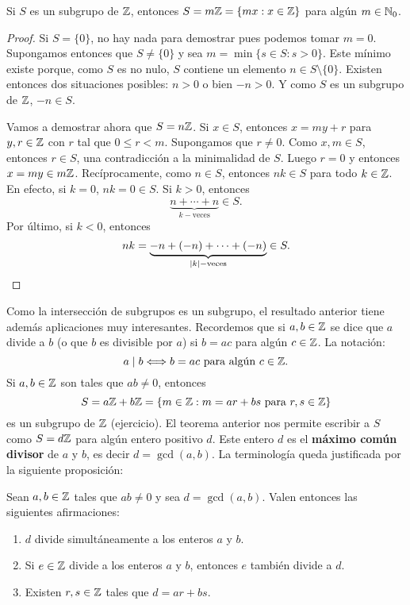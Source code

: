 
\begin{theorem}
\label{thm:Z}
	Si $S$ es un subgrupo de $\mathbb{Z}$, entonces 
	$S=m\mathbb{Z}=\{mx:x\in \mathbb{Z}\}$
	para algún $m\in\mathbb{N}_0$.  
\end{theorem}
	
\begin{proof}
	Si $S=\{0\}$, no hay nada para demostrar pues podemos
	tomar $m=0$. Supongamos entonces que $S\ne\{0\}$ y sea $m=\min\{s\in S:s>0\}$. Este mínimo existe porque, como $S$ es no nulo, $S$ contiene un elemento $n\in S\setminus\{0\}$. Existen entonces dos situaciones posibles: $n>0$ o bien $-n>0$. Y como $S$ es un subgrupo de $\mathbb{Z}$, $-n\in S$.
	 
	Vamos a demostrar ahora que $S=n\mathbb{Z}$. 
	Si $x\in S$, entonces $x=my+r$ para $y,r\in\mathbb{Z}$ con $r$ tal que
	$0\leq r<m$. Supongamos que $r\ne 0$. Como $x,m\in S$, entonces $r\in S$,
	una contradicción a la minimalidad de $S$.  Luego $r=0$ y entonces $x=my\in
	m\mathbb{Z}$. Recíprocamente, como $n\in S$, entonces $nk\in S$ para todo $k\in\mathbb{Z}$. En efecto, si $k=0$, $nk=0\in S$. Si $k>0$, entonces 
	\[
	\underbrace{n+\cdots+n}_{k-\text{veces}}\in S.
	\]
	Por último, si $k<0$, entonces 
	\[
	nk=\underbrace{-n+(-n)+\cdots+(-n)}_{|k|-\text{veces}}\in S.\qedhere
	\]		
\end{proof}

Como la intersección de subgrupos es un subgrupo, 
el resultado anterior tiene además aplicaciones muy interesantes. Recordemos que si $a,b\in\mathbb{Z}$ 
se dice que $a$ divide a $b$ (o que $b$ es divisible por $a$) 
si $b=ac$ para algún $c\in\mathbb{Z}$. La notación: 
\[
a\mid b\Longleftrightarrow b=ac\text{ para algún $c\in\mathbb{Z}$.}
\]
Si $a,b\in\mathbb{Z}$ son tales que $ab\ne0$, entonces 
\[
S=a\mathbb{Z}+b\mathbb{Z}=\{m\in\mathbb{Z}:m=ar+bs\text{ para $r,s\in\mathbb{Z}$}\}
\]
es un subgrupo de $\mathbb{Z}$ (ejercicio). El teorema anterior nos permite escribir a $S$ como $S=d\mathbb{Z}$ para algún entero positivo $d$. Este entero $d$ 
es el \textbf{máximo común divisor} de $a$ y $b$, es decir $d=\gcd(a,b)$. La terminología queda justificada por la siguiente proposición:

\begin{proposition}
Sean $a,b\in\mathbb{Z}$ tales que $ab\ne0$ y sea $d=\gcd(a,b)$. Valen entonces las siguientes afirmaciones:
\begin{enumerate}
\item $d$ divide simultáneamente a los enteros $a$ y $b$. 
\item Si $e\in\mathbb{Z}$ divide a los enteros $a$ y $b$, entonces $e$ también divide a $d$.
\item Existen $r,s\in\mathbb{Z}$ tales que $d=ar+bs$. 
\end{enumerate}
\end{proposition}

